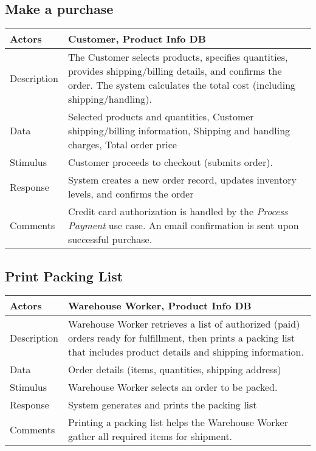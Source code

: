 \documentclass{report}
\begin{document}
    \subsection{Make a purchase}
    \begin{center}
        \begin{tabular}{|p{5cm}|p{8cm}|}
            \hline
            Actors & 
            Customer, Product Info DB \\
            \hline
            Description & 
            The Customer selects products, specifies quantities, provides 
            shipping/billing details, and confirms the order. The system 
            calculates the total cost (including shipping/handling). \\
            \hline
            Data & 
            Selected products and quantities, Customer shipping/billing information, Shipping and handling charges, Total order price \\
            \hline
            Stimulus & 
            Customer proceeds to checkout (submits order). \\
            \hline
            Response & 
            System creates a new order record, updates inventory levels, 
            and confirms the order \\
            \hline
            Comments & 
            Credit card authorization is handled by the \emph{Process Payment} 
            use case. An email confirmation is sent upon successful purchase. \\
            \hline
        \end{tabular}
    \end{center}
    

    \pagebreak 
    \subsection{Print Packing List}
    \bigbreak \noindent 
    \begin{center}
        \begin{tabular}{|p{4cm}|p{8cm}|}
            \hline
            Actors & 
            Warehouse Worker, Product Info DB \\
            \hline
            Description & 
            Warehouse Worker retrieves a list of authorized (paid) orders 
            ready for fulfillment, then prints a packing list that 
            includes product details and shipping information. \\
            \hline
            Data & 
            Order details (items, quantities, shipping address) \\
            \hline
            Stimulus & 
            Warehouse Worker selects an order to be packed. \\
            \hline
            Response & 
            System generates and prints the packing list \\
            \hline
            Comments & 
            Printing a packing list helps the Warehouse Worker gather 
            all required items for shipment. \\
            \hline
        \end{tabular}
    \end{center}
\end{document}
